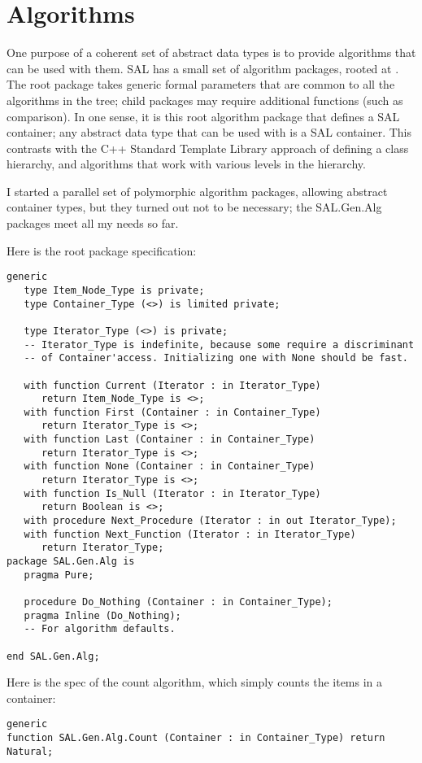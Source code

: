 \documentclass{article}
\begin{document}
\section{Algorithms}
One purpose of a coherent set of abstract data types is to provide
algorithms that can be used with them. SAL has a small set of
algorithm packages, rooted at . The root
package takes generic formal parameters that are common to all the
algorithms in the tree; child packages may require additional
functions (such as comparison). In one sense, it is this root
algorithm package that defines a SAL container; any abstract data type
that can be used with  is a SAL container.
This contrasts with the C++ Standard Template Library approach of
defining a class hierarchy, and algorithms that work with various
levels in the hierarchy.

I started a parallel set of polymorphic algorithm packages, allowing
abstract container types, but they turned out not to be necessary; the
SAL.Gen.Alg packages meet all my needs so far.

Here is the root  package specification:
\begin{verbatim}
generic
   type Item_Node_Type is private;
   type Container_Type (<>) is limited private;

   type Iterator_Type (<>) is private;
   -- Iterator_Type is indefinite, because some require a discriminant
   -- of Container'access. Initializing one with None should be fast.

   with function Current (Iterator : in Iterator_Type) 
      return Item_Node_Type is <>;
   with function First (Container : in Container_Type) 
      return Iterator_Type is <>;
   with function Last (Container : in Container_Type) 
      return Iterator_Type is <>;
   with function None (Container : in Container_Type) 
      return Iterator_Type is <>;
   with function Is_Null (Iterator : in Iterator_Type) 
      return Boolean is <>;
   with procedure Next_Procedure (Iterator : in out Iterator_Type);
   with function Next_Function (Iterator : in Iterator_Type) 
      return Iterator_Type;
package SAL.Gen.Alg is
   pragma Pure;

   procedure Do_Nothing (Container : in Container_Type);
   pragma Inline (Do_Nothing);
   -- For algorithm defaults.

end SAL.Gen.Alg;
\end{verbatim}

Here is the spec of the count algorithm, which simply counts the items
in a container:
\begin{verbatim}
generic
function SAL.Gen.Alg.Count (Container : in Container_Type) return Natural;
\end{verbatim}
\end{document}
